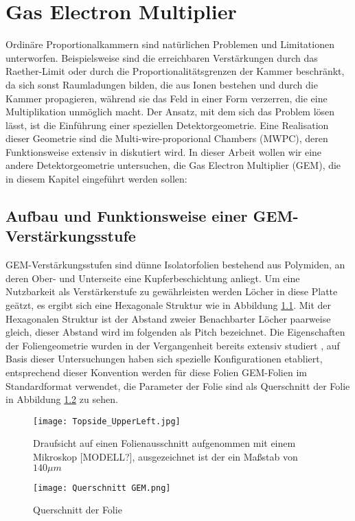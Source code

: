 \chapter{Gas Electron Multiplier}
Ordinäre Proportionalkammern sind natürlichen Problemen und Limitationen unterworfen. Beispielsweise sind die erreichbaren Verstärkungen durch das Raether-Limit oder durch die Proportionalitätsgrenzen der Kammer beschränkt, da sich sonst Raumladungen bilden, die aus Ionen bestehen und durch die Kammer propagieren, während sie das Feld in einer Form verzerren, die eine Multiplikation unmöglich macht. Der Ansatz, mit dem sich das Problem lösen lässt, ist die Einführung einer speziellen Detektorgeometrie. Eine Realisation dieser Geometrie sind die Multi-wire-proporional Chambers (MWPC), deren Funktionsweise extensiv in \cite{Sauli_Multiwire} diskutiert wird. 		In dieser Arbeit wollen wir eine andere Detektorgeometrie untersuchen, die Gas Electron Multiplier (GEM), die in diesem Kapitel eingeführt werden sollen:			 
				
\section{Aufbau und Funktionsweise einer GEM-Verstärkungsstufe}
GEM-Verstärkungsstufen sind dünne Isolatorfolien bestehend aus Polymiden, an deren Ober- und Unterseite eine Kupferbeschichtung anliegt. Um eine Nutzbarkeit als Verstärkerstufe zu gewährleisten werden Löcher in diese Platte geätzt, es ergibt sich eine Hexagonale Struktur wie in Abbildung \ref{fig:Draufsicht}. Mit der Hexagonalen Struktur ist der Abstand zweier Benachbarter Löcher paarweise gleich, dieser Abstand wird im folgenden als Pitch bezeichnet. Die Eigenschaften der Foliengeometrie wurden in der Vergangenheit bereits extensiv studiert \cite{Sauli_Übersicht}, auf Basis dieser Untersuchungen haben sich spezielle Konfigurationen etabliert, entsprechend dieser Konvention werden für diese Folien GEM-Folien im Standardformat verwendet, die Parameter der Folie sind als Querschnitt der Folie in Abbildung \ref{fig:Querschnitt} zu sehen.

	\begin{figure}[h]
		\centering
		\texttt{[image: Topside\_UpperLeft.jpg]}
		\caption{Draufsicht auf einen Folienausschnitt aufgenommen mit einem Mikroskop [MODELL?], ausgezeichnet ist der ein Maßstab von $140 \si{\mu m}$}
		\label{fig:Draufsicht}
	\end{figure}

	\begin{figure}[h]
		\centering
		\texttt{[image: Querschnitt GEM.png]}
		\caption{Querschnitt der Folie}
		\label{fig:Querschnitt}
	\end{figure}
		
